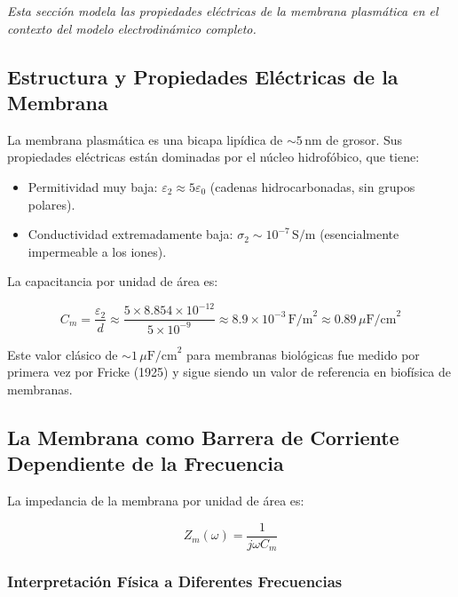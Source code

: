 \documentclass[12pt]{article}
\begin{document}
\label{sec:membrane}


\noindent\textit{Esta secci\'on modela las propiedades el\'ectricas de la membrana plasm\'atica
en el contexto del modelo electrodin\'amico completo.}

\subsection{Estructura y Propiedades El\'ectricas de la Membrana}

La membrana plasm\'atica es una bicapa lip\'idica de $\sim5\,\text{nm}$ de grosor. Sus
propiedades el\'ectricas est\'an dominadas por el n\'ucleo hidrof\'obico, que tiene:

\begin{itemize}
\item Permitividad muy baja: $\varepsilon_2 \approx 5\varepsilon_0$
(cadenas hidrocarbonadas, sin grupos polares).
\item Conductividad extremadamente baja: $\sigma_2 \sim 10^{-7}\,\text{S/m}$
(esencialmente impermeable a los iones).
\end{itemize}

La capacitancia por unidad de \'area es:

\begin{equation}
C_m = \frac{\varepsilon_2}{d}
\approx \frac{5 \times 8.854\times10^{-12}}{5\times10^{-9}}
\approx 8.9\times10^{-3}\,\text{F/m}^2 \approx 0.89\,\mu\text{F/cm}^2
\end{equation}

Este valor cl\'asico de $\sim 1\,\mu\text{F/cm}^2$ para membranas biol\'ogicas fue medido
por primera vez por Fricke (1925) \citep{Fricke1925} y sigue siendo un valor de referencia
en biof\'isica de membranas.

\subsection{La Membrana como Barrera de Corriente Dependiente de la Frecuencia}

La impedancia de la membrana por unidad de \'area es:

\begin{equation}
Z_m(\omega) = \frac{1}{j\omega C_m}
\end{equation}

\subsubsection{Interpretaci\'on F\'isica a Diferentes Frecuencias}
\end{document}
